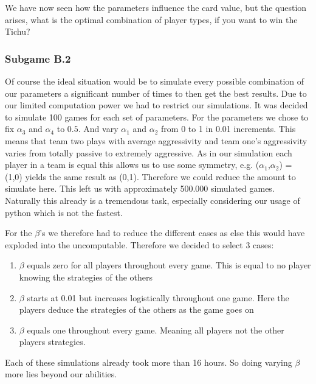 We have now seen how the parameters influence the card value, but the question arises, what is the optimal combination of player types, if you want to win the Tichu?

\subsubsection{Subgame B.2}
Of course the ideal situation would be to simulate every possible combination of our parameters a significant number of times to then get the best results. Due to our limited computation power we had to restrict our simulations. It was decided to simulate 100 games for each set of parameters. For the parameters we chose to fix $\alpha_3$ and $\alpha_4$ to $0.5$. And vary $\alpha_1$ and $\alpha_2$ from 0 to 1 in 0.01 increments. This means that team two plays with average aggressivity and team one’s aggressivity varies from totally passive to extremely aggressive. As in our simulation each player in a team is equal this allows us to use some symmetry, e.g. ($\alpha_1$,$\alpha_2$) = (1,0) yields the same result as (0,1). Therefore we could reduce the amount to simulate here. This left us with approximately 500.000 simulated games. Naturally this already is a tremendous task, especially considering our usage of python which is not the fastest.

For the $\beta$'s we therefore had to reduce the different cases as else this would have exploded into the uncomputable. Therefore we decided to select 3 cases:
\begin{enumerate}
\item $\beta$ equals zero for all players throughout every game. This is equal to no player knowing the strategies of the others
\item $\beta$ starts at 0.01 but increases logistically throughout one game. Here the players deduce the strategies of the others as the game goes on
\item $\beta$ equals one throughout every game. Meaning all players not the other players strategies.
\end{enumerate}
Each of these simulations already took more than 16 hours. So doing varying $\beta$ more lies beyond our abilities. 

